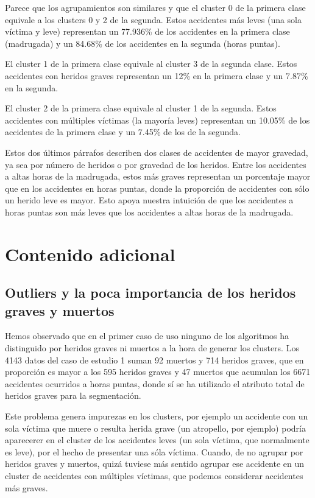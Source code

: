 \documentclass[oneside]{book}
\begin{document}
Parece que los agrupamientos son similares y que el cluster 0 de la
primera clase equivale a los clusters 0 y 2 de la segunda. Estos
accidentes más leves (una sola víctima y leve) representan un 77.936\%
de los accidentes en la primera clase (madrugada) y un 84.68\% de los
accidentes en la segunda (horas puntas).

El cluster 1 de la primera clase equivale al cluster 3 de la segunda
clase. Estos accidentes con heridos graves representan un 12\% en la
primera clase y un 7.87\% en la segunda.

El cluster 2 de la primera clase equivale al cluster 1 de la
segunda. Estos accidentes con múltiples víctimas (la mayoría leves)
representan un 10.05\% de los accidentes de la primera clase y un
7.45\% de los de la segunda.

Estos dos últimos párrafos describen dos clases de accidentes de mayor
gravedad, ya sea por número de heridos o por gravedad de los
heridos. Entre los accidentes a altas horas de la madrugada, estos más
graves representan un porcentaje mayor que en los accidentes en horas
puntas, donde la proporción de accidentes con sólo un herido leve es
mayor. Esto apoya nuestra intuición de que los accidentes a horas
puntas son más leves que los accidentes a altas horas de la madrugada.

\section{Contenido adicional}

\subsection{Outliers y la poca importancia de los heridos graves y
  muertos} \label{sec:outliers}

Hemos observado que en el primer caso de uso ninguno de los algoritmos
ha distinguido por heridos graves ni muertos a la hora de generar los
clusters. Los 4143 datos del caso de estudio 1 suman 92 muertos y 714
heridos graves, que en proporción es mayor a los 595 heridos graves y
47 muertos que acumulan los 6671 accidentes ocurridos a horas puntas,
donde sí se ha utilizado el atributo total de heridos graves para la
segmentación.

Este problema genera impurezas en los clusters, por ejemplo un
accidente con un sola víctima que muere o resulta herida grave (un
atropello, por ejemplo) podría aparecerer en el cluster de los
accidentes leves (un sola víctima, que normalmente es leve), por el
hecho de presentar una sóla víctima. Cuando, de no agrupar por heridos
graves y muertos, quizá tuviese más sentido agrupar ese accidente en
un cluster de accidentes con múltiples víctimas, que podemos
considerar accidentes más graves.
\end{document}
